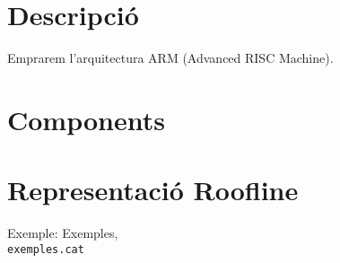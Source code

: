 \documentclass{article}
\begin{document}






\section{Descripció}
Emprarem l'arquitectura ARM (Advanced RISC Machine). \cite{exemple}

\section{Components}

\section{Representació Roofline}

\begin{thebibliography}{}
 Exemple: Exemples, \\ \texttt{exemples.cat}

\end{thebibliography}
\end{document}
